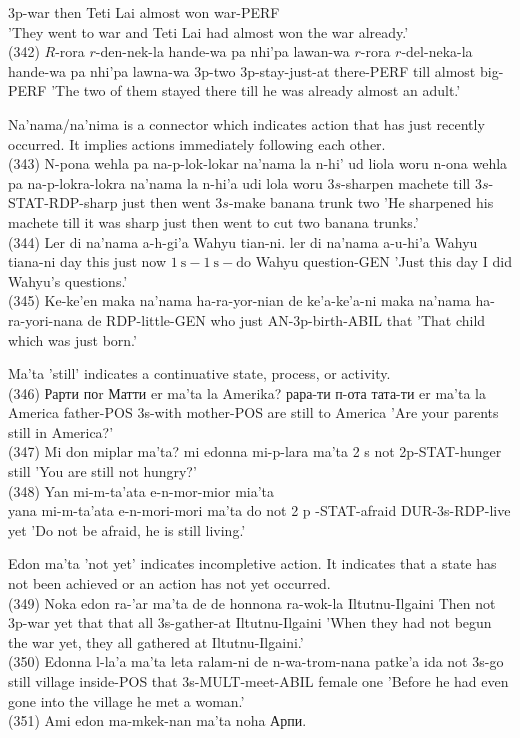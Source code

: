 \documentclass[10pt]{article}
\begin{document}
3p-war then Teti Lai almost won war-PERF\\
'They went to war and Teti Lai had almost won the war already.'\\
(342) \(R\)-rora \(r\)-den-nek-la hande-wa pa nhi'pa lawan-wa \(r\)-rora \(r\)-del-neka-la hande-wa pa nhi'pa lawna-wa 3p-two 3p-stay-just-at there-PERF till almost big-PERF 'The two of them stayed there till he was already almost an adult.'

Na'nama/na'nima is a connector which indicates action that has just recently occurred. It implies actions immediately following each other.\\
(343) N-pona wehla pa na-p-lok-lokar na'nama la n-hi' ud liola woru n-ona wehla pa na-p-lokra-lokra na'nama la n-hi'a udi lola woru \(3 s\)-sharpen machete till \(3 s\)-STAT-RDP-sharp just then went \(3 s\)-make banana trunk two 'He sharpened his machete till it was sharp just then went to cut two banana trunks.'\\
(344) Ler di na'nama a-h-gi'a Wahyu tian-ni. ler di na'nama a-u-hi'a Wahyu tiana-ni day this just now \(1 \mathrm{~s}-1 \mathrm{~s}-\mathrm{do}\) Wahyu question-GEN 'Just this day I did Wahyu's questions.'\\
(345) Ke-ke'en maka na'nama ha-ra-yor-nian de ke'a-ke'a-ni maka na'nama ha-ra-yori-nana de RDP-little-GEN who just AN-3p-birth-ABIL that 'That child which was just born.'

Ma'ta 'still' indicates a continuative state, process, or activity.\\
(346) Рарти поr Матти er ma'ta la Amerika? рара-ти п-ота тата-ти er ma'ta la America father-POS 3s-with mother-POS are still to America 'Are your parents still in America?'\\
(347) Mi don miplar ma'ta? mi edonna mi-p-lara ma'ta 2 s not 2p-STAT-hunger still 'You are still not hungry?'\\
(348) Yan mi-m-ta'ata e-n-mor-mior mia'ta\\
yana mi-m-ta'ata e-n-mori-mori ma'ta do not 2 p -STAT-afraid DUR-3s-RDP-live yet 'Do not be afraid, he is still living.'

Edon ma'ta 'not yet' indicates incompletive action. It indicates that a state has not been achieved or an action has not yet occurred.\\
(349) Noka edon ra-'ar ma'ta de de honnona ra-wok-la Iltutnu-Ilgaini Then not 3p-war yet that that all 3s-gather-at Iltutnu-Ilgaini 'When they had not begun the war yet, they all gathered at Iltutnu-Ilgaini.'\\
(350) Edonna l-la'a ma'ta leta ralam-ni de n-wa-trom-nana patke'a ida not 3s-go still village inside-POS that 3s-MULT-meet-ABIL female one 'Before he had even gone into the village he met a woman.'\\
(351) Ami edon ma-mkek-nan ma'ta noha Арпи.
\end{document}
